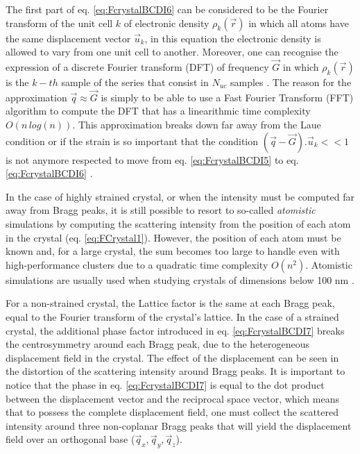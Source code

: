 The first part of eq. \ref{eq:FcrystalBCDI6} can be considered to be the Fourier transform of the unit cell $k$ of electronic density $\rho_k(\vec{r})$ in which all atoms have the same displacement vector $\vec{u}_k$, in this equation the electronic density is allowed to vary from one unit cell to another.
Moreover, one can recognise the expression of a discrete Fourier transform (DFT) of frequency $\vec{G}$ in which $\rho_k(\vec{r})$ is the $k-th$ sample of the series that consist in $N_{uc}$ samples \parencite{Cooley1965, Cochran1967, favre-nicolin_semiconductor_2011, Godard2021}.
The reason for the approximation $\vec{q} \approx \vec{G}$ is simply to be able to use a Fast Fourier Transform (FFT) algorithm to compute the DFT that has a linearithmic time complexity $O(n \, log(n))$.
This approximation breaks down far away from the Laue condition or if the strain is so important that the condition $(\vec{q}-\vec{G}).\vec{u}_k<<1$ is not anymore respected to move from eq. \ref{eq:FcrystalBCDI5} to eq. \ref{eq:FcrystalBCDI6} \parencite{Takagi1969}.

In the case of highly strained crystal, or when the intensity must be computed far away from Bragg peaks, it is still possible to resort to so-called \textit{atomistic} simulations by computing the scattering intensity from the position of each atom in the crystal (eq. \ref{eq:FCrystal1}).
However, the position of each atom must be known and, for a large crystal, the sum becomes too large to handle even with high-performance clusters due to a quadratic time complexity $O(n^2)$.
Atomistic simulations are usually used when studying crystals of dimensions below 100 nm \parencite{Dupraz2022}.

For a non-strained crystal, the Lattice factor is the same at each Bragg peak, equal to the Fourier transform of the crystal's lattice.
In the case of a strained crystal, the additional phase factor introduced in eq. \ref{eq:FcrystalBCDI7} breaks the centrosymmetry around each Bragg peak, due to the heterogeneous displacement field in the crystal.
The effect of the displacement can be seen in the distortion of the scattering intensity around Bragg peaks.
It is important to notice that the phase in eq. \ref{eq:FcrystalBCDI7} is equal to the dot product between the displacement vector and the reciprocal space vector, which means that to possess the complete displacement field, one must collect the scattered intensity around three non-coplanar Bragg peaks \parencite{Newton2010} that will yield the displacement field over an orthogonal base ($\vec{q}_x, \vec{q}_y, \vec{q}_z$).

